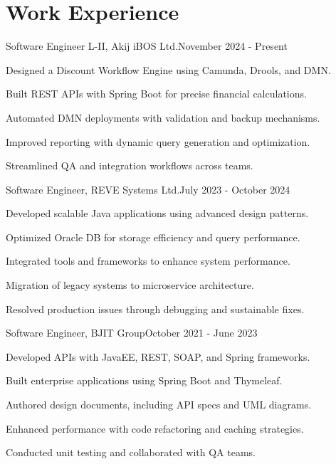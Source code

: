 \section{\textbf{Work Experience}}
\begin{joblong}
{Software Engineer L-II, Akij iBOS Ltd.}{November 2024 - Present}
    \item Designed a Discount Workflow Engine using Camunda, Drools, and DMN.  
    \item Built REST APIs with Spring Boot for precise financial calculations.  
    \item Automated DMN deployments with validation and backup mechanisms.  
    \item Improved reporting with dynamic query generation and optimization.  
    \item Streamlined QA and integration workflows across teams. 
\end{joblong}

\begin{joblong}
{Software Engineer, REVE Systems Ltd.}{July 2023 - October 2024}
    \item Developed scalable Java applications using advanced design patterns.  
    \item Optimized Oracle DB for storage efficiency and query performance.  
    \item Integrated tools and frameworks to enhance system performance.  
    \item Migration of legacy systems to microservice architecture.  
    \item Resolved production issues through debugging and sustainable fixes. 
\end{joblong}

\begin{joblong}
{Software Engineer, BJIT Group}{October 2021 - June 2023}
    \item Developed APIs with JavaEE, REST, SOAP, and Spring frameworks.  
    \item Built enterprise applications using Spring Boot and Thymeleaf.  
    \item Authored design documents, including API specs and UML diagrams.  
    \item Enhanced performance with code refactoring and caching strategies.  
    \item Conducted unit testing and collaborated with QA teams.  
\end{joblong}
